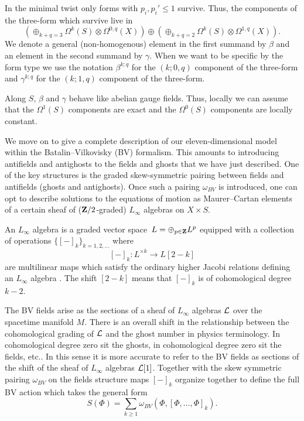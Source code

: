 In the minimal twist only forms with $p_i ,p_i'\leq 1$ survive. 
Thus, the components of the three-form which survive live in
\[
\left(\oplus_{k+q = 3} \Omega^k(S) \otimes \Omega^{0,q}(X)\right) \oplus 
\left(\oplus_{k+q = 2} \Omega^k(S) \otimes \Omega^{1,q}(X)\right) .
\]
We denote a general (non-homogenous) element in the first summand by $\beta$ and an element in the second summand by $\gamma$.
When we want to be specific by the form type we use the notation $\beta^{k;q}$ for the $(k;0,q)$ component of the three-form and $\gamma^{k;q}$ for the $(k;1,q)$ component of the three-form.

Along $S$, $\beta$ and $\gamma$ behave like abelian gauge fields.
Thus, locally we can assume that the $\Omega^1(S)$ components are exact and the $\Omega^0(S)$ components are locally constant.


\parsec[s:Lsugra]

We move on to give a complete description of our eleven-dimensional model within the Batalin--Vilkovisky (BV) formalism.
This amounts to introducing antifields and antighosts to the fields and ghosts that we have just described.
One of the key structures is the graded skew-symmetric pairing between fields and antifields (ghosts and antighosts).
Once such a pairing $\omega_{BV}$ is introduced, one can opt to describe solutions to the equations of motion as Maurer--Cartan elements of a certain sheaf of ($\mathbf{Z}/2$-graded) $L_\infty$ algebras on $X \times S$.

An $L_\infty$ algebra is a graded vector space~$L=\oplus_{p\in \mathbf{Z}} L^p$ equipped with a collection of operations $\{[-]_k\}_{k = 1,2,\ldots}$ where 
\[
[-]_k \colon L^{\times k} \to L[2-k] 
\]
are multilinear maps which satisfy the ordinary higher Jacobi relations defining an $L_\infty$ algebra \cite{??}. 
The shift $[2-k]$ means that $[-]_k$ is of cohomological degree $k-2$. 

The BV fields arise as the sections of a sheaf of $L_\infty$ algebras $\mathcal L$ over the spacetime manifold $M$.
There is an overall shift in the relationship between the cohomological grading of $\mathcal L$ and the ghost number in physics terminology. 
In cohomological degree zero sit the ghosts, in cohomological degree zero sit the fields, etc..
In this sense it is more accurate to refer to the BV fields as sections of the shift of the sheaf of $L_\infty$ algebras $\mathcal L[1]$. 
Together with the skew symmetric pairing $\omega_{BV}$ on the fields structure maps $[-]_k$ organize together to define the full BV action which takes the general form
\[
S(\Phi) = \sum_{k \geq 1} \omega_{BV} \left(\Phi , [\Phi,\ldots,\Phi]_{k}\right) .
\]

